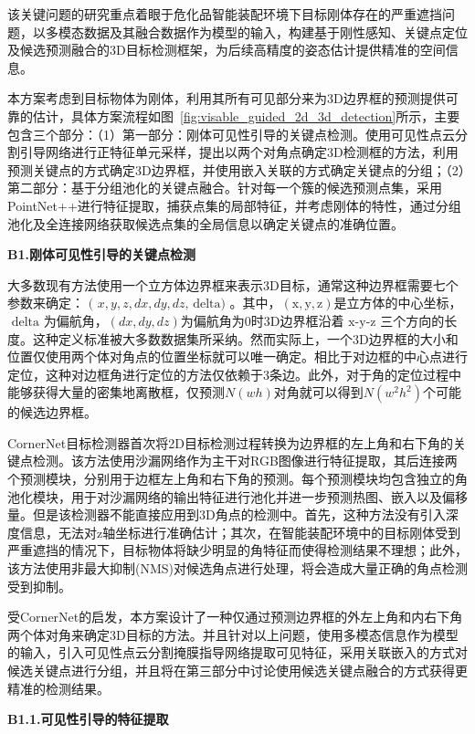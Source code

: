 \documentclass[12pt]{article}
\begin{document}
该关键问题的研究重点着眼于危化品智能装配环境下目标刚体存在的严重遮挡问题，以多模态数据及其融合数据作为模型的输入，构建基于刚性感知、关键点定位及候选预测融合的3D目标检测框架，为后续高精度的姿态估计提供精准的空间信息。

本方案考虑到目标物体为刚体，利用其所有可见部分来为3D边界框的预测提供可靠的估计，具体方案流程如图~\ref{fig:visable_guided_2d_3d_detection}所示，主要包含三个部分：（1）第一部分：刚体可见性引导的关键点检测。使用可见性点云分割引导网络进行正特征单元采样，提出以两个对角点确定3D检测框的方法，利用预测关键点的方式确定3D边界框，并使用嵌入关联的方式确定关键点的分组；（2）第二部分：基于分组池化的关键点融合。针对每一个簇的候选预测点集，采用PointNet++进行特征提取，捕获点集的局部特征，并考虑刚体的特性，通过分组池化及全连接网络获取候选点集的全局信息以确定关键点的准确位置。

\textbf{B1.刚体可见性引导的关键点检测}

大多数现有方法使用一个立方体边界框来表示3D目标，通常这种边界框需要七个参数来确定：$\text { ( } x, y, z, d x, d y, d z \text {, delta) }$。其中，$(\mathrm{x}, \mathrm{y}, \mathrm{z})$是立方体的中心坐标，$\text { delta }$为偏航角，$(d x, d y, d z)$为偏航角为0时3D边界框沿着$\text { x-y-z }$三个方向的长度。这种定义标准被大多数数据集所采纳。然而实际上，一个3D边界框的大小和位置仅使用两个体对角点的位置坐标就可以唯一确定。相比于对边框的中心点进行定位，这种对边框角进行定位的方法仅依赖于3条边。此外，对于角的定位过程中能够获得大量的密集地离散框，仅预测$N(w h)$对角就可以得到$N\left(w^2 h^2\right)$个可能的候选边界框。

CornerNet目标检测器首次将2D目标检测过程转换为边界框的左上角和右下角的关键点检测。该方法使用沙漏网络作为主干对RGB图像进行特征提取，其后连接两个预测模块，分别用于边框左上角和右下角的预测。每个预测模块均包含独立的角池化模块，用于对沙漏网络的输出特征进行池化并进一步预测热图、嵌入以及偏移量。但是该检测器不能直接应用到3D角点的检测中。首先，这种方法没有引入深度信息，无法对z轴坐标进行准确估计；其次，在智能装配环境中的目标刚体受到严重遮挡的情况下，目标物体将缺少明显的角特征而使得检测结果不理想；此外，该方法使用非最大抑制(NMS)对候选角点进行处理，将会造成大量正确的角点检测受到抑制。

受CornerNet的启发，本方案设计了一种仅通过预测边界框的外左上角和内右下角两个体对角来确定3D目标的方法。并且针对以上问题，使用多模态信息作为模型的输入，引入可见性点云分割掩膜指导网络提取可见特征，采用关联嵌入的方式对候选关键点进行分组，并且将在第三部分中讨论使用候选关键点融合的方式获得更精准的检测结果。

\textbf{B1.1.可见性引导的特征提取}
\end{document}
